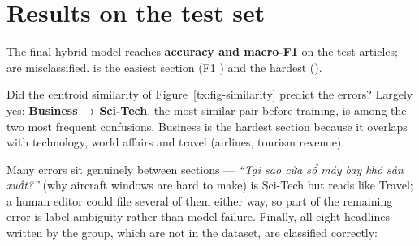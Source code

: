 \section{Results on the test set}\label{tx:results}
\begin{table}[H]\centering\small
\caption{Validation and test scores of the compared approaches. The final model was chosen on validation macro-F1.}\label{tx:tab-comparison}

\end{table}

The final hybrid model reaches \textbf{accuracy \TXFinAcc{} and macro-F1 \TXFinF} on the \TXTest{} test articles; \TXNMis{} are
misclassified. \emph{\TXBestClass} is the easiest section (F1 \TXBestClassF) and \emph{\TXWorstClass} the hardest
(\TXWorstClassF).

\begin{table}[H]\centering\small
\caption{Per-section test F1 of the final model.}\label{tx:tab-perclass}

\end{table}


\begin{table}[H]\centering\small
\caption{Most frequent confusions on the test set.}\label{tx:tab-confusions}

\end{table}
\begin{finding}
\Q Did the centroid similarity of Figure~\ref{tx:fig-similarity} predict the errors?
\F Largely yes: \textbf{Business → Sci-Tech}, the most similar pair before training, is among the two most frequent confusions.
Business is the hardest section because it overlaps with technology, world affairs and travel (airlines, tourism revenue).
\end{finding}

\begin{table}[H]\centering\small
\caption{Examples of misclassified test articles.}\label{tx:tab-wrong}

\end{table}
Many errors sit genuinely between sections — \textit{``Tại sao cửa sổ máy bay khó sản xuất?''} (why aircraft windows are hard to
make) is Sci-Tech but reads like Travel; a human editor could file several of them either way, so part of the remaining error
is label ambiguity rather than model failure. Finally, all eight headlines written by the group, which are not in the dataset,
are classified correctly:

